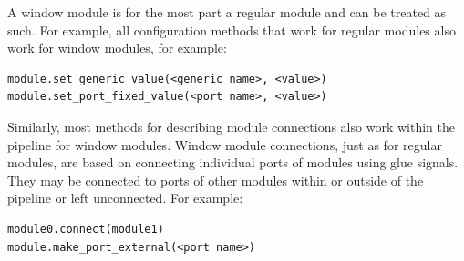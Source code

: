 A window module is for the most part a regular \asterics module and can be treated as such.
For example, all configuration methods that work for regular modules also work for window modules, for example:
\begin{lstlisting}[style=AutomaticsPython]
module.set_generic_value(<generic name>, <value>)
module.set_port_fixed_value(<port name>, <value>)
\end{lstlisting}

Similarly, most methods for describing module connections also work within the pipeline for window modules.
Window module connections, just as for regular modules, are based on connecting individual ports of modules using glue signals.
They may be connected to ports of other modules within or outside of the pipeline or left unconnected.
For example:
\begin{lstlisting}[style=AutomaticsPython]
module0.connect(module1)
module.make_port_external(<port name>)
\end{lstlisting}

